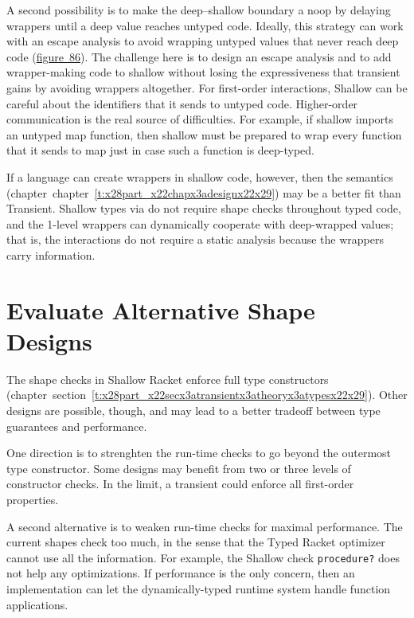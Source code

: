 \documentclass[ twoside,open=right,titlepage,numbers=noenddot,headinclude,%
                footinclude=true,cleardoublepage=empty,abstract=off,
                BCOR=5mm,paper=a4,fontsize=11pt,%
                ngerman,american,%
                parts,pdfspacing]{scrreprt}
\newcommand{\ChapRef}[2]{\SecRef{#1}{#2}}
\newcommand{\SecRef}[2]{section~#1}
\newcommand{\ChapRefLocal}[3]{\hyperref[#1]{\ChapRef{#2}{#3}}}
\newcommand{\SecRefLocal}[3]{\hyperref[#1]{\SecRef{#2}{#3}}}
\newcommand{\Scribtexttt}[1]{{\texttt{#1}}}
\let\SOriginalthesubsubsection\thesubsubsection
\newcommand{\Ssubsection}[2]{\subsection[#1]{#2}\let\thesubsubsection\SOriginalthesubsubsection}
\newcommand{\FigureRef}[2]{#1}
\renewcommand{\Ssubsection}[2]{\section[#1]{#2}}
\renewcommand{\ChapRefLocal}[3]{chapter~\ref{#1}}
\renewcommand{\SecRefLocal}[3]{section~\ref{#1}}
\begin{document}
A second possibility is to make the deep{--}shallow boundary
 a noop by delaying wrappers until a deep value reaches untyped code.
Ideally, this strategy can work with an escape analysis to avoid wrapping
 untyped values that never reach deep code (\hyperref[t:x28counter_x28x22figurex22_x22figx3abothx3aopt1x22x29x29]{figure~\FigureRef{86}{t:x28counter_x28x22figurex22_x22figx3abothx3aopt1x22x29x29}}).
The challenge here is to design an escape analysis and to add wrapper{-}making
 code to shallow without losing the expressiveness that transient gains
 by avoiding wrappers altogether.
For first{-}order interactions,
 Shallow can be careful about the identifiers that it sends to untyped code.
Higher{-}order communication is the real source of difficulties.
For example,
 if shallow imports an untyped map function, then shallow must be
 prepared to wrap every function that it sends to map just in case such a function
 is deep{-}typed.

If a language can create wrappers in shallow code, however, then the
 \relax{\fname} semantics (chapter~\ChapRefLocal{t:x28part_x22chapx3adesignx22x29}{4}{Design Analysis Method}) may be a better fit than Transient.
Shallow types via \relax{\fname} do not require shape checks throughout
 typed code, and the 1{-}level wrappers can dynamically cooperate with deep{-}wrapped
 values; that is, the interactions do not require a static analysis
 because the wrappers carry information.

\Ssubsection{Evaluate Alternative Shape Designs}{Evaluate Alternative Shape Designs}\label{t:x28part_x22Evaluatex5fAlternativex5fShapex5fDesignsx22x29}

The shape checks in Shallow Racket enforce full type constructors
 (chapter~\SecRefLocal{t:x28part_x22secx3atransientx3atheoryx3atypesx22x29}{5.1.1}{More{-}Expressive Static Types}).
Other designs are possible, though, and may lead to a better tradeoff
 between type guarantees and performance.

One direction is to strenghten the run{-}time checks to go beyond the outermost type
 constructor.
Some designs may benefit from two or three levels of constructor checks.
In the limit, a transient could enforce all first{-}order properties.

A second alternative is to weaken run{-}time checks for maximal performance.
The current shapes check too much, in the sense that the Typed Racket optimizer
 cannot use all the information.
For example, the Shallow check \Scribtexttt{procedure{\hbox{\texttt{?}}}} does not help any optimizations.
If performance is the only concern, then an implementation can let the dynamically{-}typed
 runtime system handle function applications.
\end{document}
